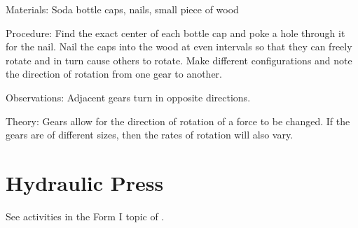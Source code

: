 \begin{multicols}{2}
\begin{description*}
\item[Materials:]{Soda bottle caps, nails, small piece of wood}
\item[Procedure:]{Find the exact center of each bottle cap and poke a hole through it for the nail. Nail the caps into the wood at even intervals so that they can freely rotate and in turn cause others to rotate. Make different configurations and note the direction of rotation from one gear to another.}
\item[Observations:]{Adjacent gears turn in opposite directions.}
\item[Theory:]{Gears allow for the direction of rotation of a force to be changed. If the gears are of different sizes, then the rates of rotation will also vary.}
\end{description*}


\section*{Hydraulic Press}

See activities in the Form I topic of .



\end{multicols}

\pagebreak
